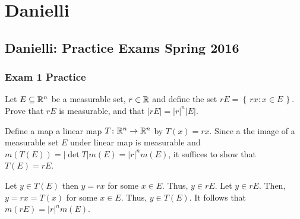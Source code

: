 \section{Danielli}
\subsection{Danielli: Practice Exams Spring 2016}
\setcounter{exercise}{0}
\setcounter{equation}{0}

\subsubsection{Exam 1 Practice}
\begin{problem}
  Let \(E\subseteq\mathbb{R}^n\) be a measurable set, \(r\in\mathbb{R}\) and define the
  set \(rE=\left\{\,rx : x\in E\,\right\}\). Prove that \(rE\) is
  measurable, and that \(|rE|=|r|^n|E|\).
\end{problem}
\begin{solution}
  Define a map a linear map \(T\colon\mathbb{R}^n\to\mathbb{R}^n\) by
  \(T(x)=rx\). Since a the image of a measurable set \(E\) under linear map
  is measurable and \(m(T(E))=|{\det T}|m(E)=|r|^nm(E)\), it suffices to
  show that \(T(E)=rE\).

  Let \(y\in T(E)\) then \(y=rx\) for some \(x\in E\). Thus, \(y\in
  rE\). Let \(y\in rE\). Then, \(y=rx=T(x)\) for some \(x\in E\). Thus,
  \(y\in T(E)\). It follows that \(m(rE)=|r|^nm(E)\).
\end{solution}

